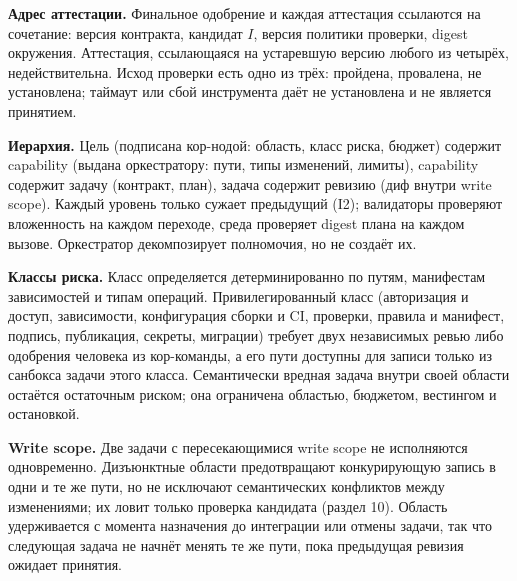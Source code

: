 \documentclass[11pt,a4paper]{article}
\begin{document}
\textbf{Адрес аттестации.} Финальное одобрение и каждая аттестация ссылаются на сочетание: версия контракта, кандидат $I$, версия политики проверки, digest окружения. Аттестация, ссылающаяся на устаревшую версию любого из четырёх, недействительна. Исход проверки есть одно из трёх: пройдена, провалена, не установлена; таймаут или сбой инструмента даёт не установлена и не является принятием.

\textbf{Иерархия.} Цель (подписана кор-нодой: область, класс риска, бюджет) содержит capability (выдана оркестратору: пути, типы изменений, лимиты), capability содержит задачу (контракт, план), задача содержит ревизию (диф внутри write scope). Каждый уровень только сужает предыдущий (I2); валидаторы проверяют вложенность на каждом переходе, среда проверяет digest плана на каждом вызове. Оркестратор декомпозирует полномочия, но не создаёт их.

\begin{center}
\end{center}

\textbf{Классы риска.} Класс определяется детерминированно по путям, манифестам зависимостей и типам операций. Привилегированный класс (авторизация и доступ, зависимости, конфигурация сборки и CI, проверки, правила и манифест, подпись, публикация, секреты, миграции) требует двух независимых ревью либо одобрения человека из кор-команды, а его пути доступны для записи только из санбокса задачи этого класса. Семантически вредная задача внутри своей области остаётся остаточным риском; она ограничена областью, бюджетом, вестингом и остановкой.

\textbf{Write scope.} Две задачи с пересекающимися write scope не исполняются одновременно. Дизъюнктные области предотвращают конкурирующую запись в одни и те же пути, но не исключают семантических конфликтов между изменениями; их ловит только проверка кандидата (раздел 10). Область удерживается с момента назначения до интеграции или отмены задачи, так что следующая задача не начнёт менять те же пути, пока предыдущая ревизия ожидает принятия.
\end{document}
